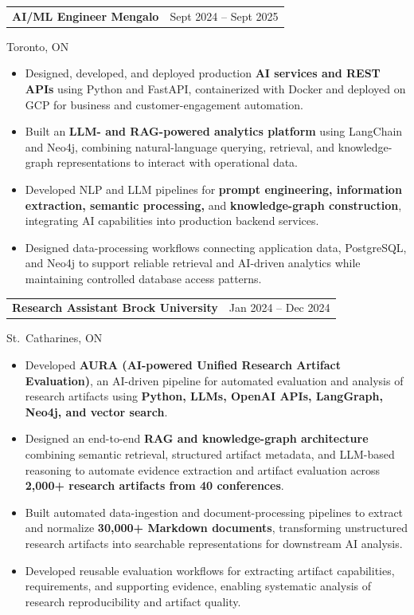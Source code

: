 \documentclass[10pt,letterpaper]{extarticle}
\makeatletter
\newcommand{\entry}[2]{%
  \vspace{2.5pt}%
  \noindent
  \begin{tabular*}{\textwidth}{@{}l@{\extracolsep{\fill}}r@{}}
    \textbf{#1} & {\color{muted}\small #2} \\
  \end{tabular*}
  \par\vspace{-1pt}%
}
\newcommand{\meta}[1]{%
  {\color{muted}\small #1}\par\vspace{1pt}%
}
\makeatother
\begin{document}
\entry{AI/ML Engineer \textnormal{\textbar} Mengalo}
{Sept 2024 -- Sept 2025}
\meta{Toronto, ON}

\begin{itemize}
\item Designed, developed, and deployed production \textbf{AI services and REST APIs} using Python and FastAPI, containerized with Docker and deployed on GCP for business and customer-engagement automation.

\item Built an \textbf{LLM- and RAG-powered analytics platform} using LangChain and Neo4j, combining natural-language querying, retrieval, and knowledge-graph representations to interact with operational data.

\item Developed NLP and LLM pipelines for \textbf{prompt engineering, information extraction, semantic processing,} and \textbf{knowledge-graph construction}, integrating AI capabilities into production backend services.

\item Designed data-processing workflows connecting application data, PostgreSQL, and Neo4j to support reliable retrieval and AI-driven analytics while maintaining controlled database access patterns.
\end{itemize}

\newpage
\entry{Research Assistant \textnormal{\textbar} Brock University}
{Jan 2024 -- Dec 2024}
\meta{St.\ Catharines, ON}

\begin{itemize}
\item Developed \textbf{AURA (AI-powered Unified Research Artifact Evaluation)}, an AI-driven pipeline for automated evaluation and analysis of research artifacts using \textbf{Python, LLMs, OpenAI APIs, LangGraph, Neo4j, and vector search}.

\item Designed an end-to-end \textbf{RAG and knowledge-graph architecture} combining semantic retrieval, structured artifact metadata, and LLM-based reasoning to automate evidence extraction and artifact evaluation across \textbf{2,000+ research artifacts from 40 conferences}.

\item Built automated data-ingestion and document-processing pipelines to extract and normalize \textbf{30,000+ Markdown documents}, transforming unstructured research artifacts into searchable representations for downstream AI analysis.

\item Developed reusable evaluation workflows for extracting artifact capabilities, requirements, and supporting evidence, enabling systematic analysis of research reproducibility and artifact quality.
\end{itemize}
\end{document}
